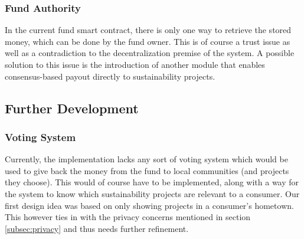 \documentclass[11pt]{article}
\begin{document}
\subsubsection{Fund Authority}
In the current fund smart contract, there is only one way to retrieve the stored money, which can be done by the fund owner. This is of course a trust issue as well as a contradiction to the decentralization premise of the system. A possible solution to this issue is the introduction of another module that enables consensus-based payout directly to sustainability projects.

\subsection{Further Development}
\subsubsection{Voting System}
Currently, the implementation lacks any sort of voting system which would be used to give back the money from the fund to local communities (and projects they choose). This would of course have to be implemented, along with a way for the system to know which sustainability projects are relevant to a consumer. Our first design idea was based on only showing projects in a consumer's hometown. This however ties in with the privacy concerns mentioned in section \ref{subsec:privacy} and thus needs further refinement. 
\end{document}
